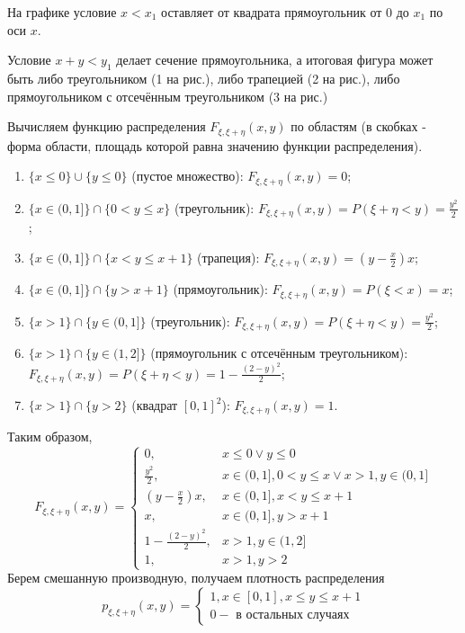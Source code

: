 \begin{enumerate}
	На графике условие $x < x_1$ оставляет от квадрата прямоугольник от 0 до $x_1$ по оси $x$.
	
	Условие $x + y < y_1$ делает сечение прямоугольника, а итоговая фигура может быть либо треугольником (1 на рис.), либо трапецией (2 на рис.), либо прямоугольником с отсечённым треугольником (3 на рис.)
	
	Вычисляем функцию распределения $F_{\xi, \xi + \eta} (x, y)$ по областям (в скобках - форма области, площадь которой равна значению функции распределения).
	\begin{enumerate}
		\item $\{ x \le 0 \} \cup \{ y \le 0 \}$ (пустое множество): $F_{\xi, \xi + \eta} (x, y) = 0$;
		\item $\{ x \in (0, 1] \} \cap \{ 0 < y \le x \}$ (треугольник): $F_{\xi, \xi + \eta} (x, y) = P(\xi + \eta < y) = \frac{y^2}{2}$;
		\item $\{ x \in (0, 1] \} \cap \{ x < y \le x + 1 \}$ (трапеция): $F_{\xi, \xi + \eta} (x, y) = \left(y-\frac{x}{2}\right)x$;
		\item $\{ x \in (0, 1] \} \cap \{ y > x + 1 \}$ (прямоугольник): $F_{\xi, \xi + \eta} (x, y) = P(\xi < x) = x$;
		\item $\{ x > 1 \} \cap \{ y \in (0, 1] \}$ (треугольник): $F_{\xi, \xi + \eta} (x, y) = P(\xi + \eta < y) = \frac{y^2}{2}$;
		\item $\{ x > 1 \} \cap \{ y \in (1, 2] \}$ (прямоугольник с отсечённым треугольником): $F_{\xi, \xi + \eta} (x, y) = P(\xi + \eta < y) = 1 - \frac{(2-y)^2}{2}$;
		\item $\{ x > 1 \} \cap \{ y > 2 \}$ (квадрат $[0, 1]^2$): $F_{\xi, \xi + \eta} (x, y) = 1$.
	\end{enumerate}
	Таким образом,
	\[
	F_{\xi, \xi + \eta} (x, y) =
	\begin{cases}
		0, &x \le 0 \lor y \le 0 \\
		\frac{y^2}{2}, &x \in (0, 1], 0 < y \le x \lor x > 1, y \in (0, 1] \\
		\left( y - \frac{x}{2} \right) x, &x \in (0, 1], x < y \le x + 1 \\
		x, &x \in (0, 1], y > x + 1 \\
		1 - \frac{(2-y)^2}{2}, &x > 1, y \in (1, 2] \\
		1, &x > 1, y > 2
	\end{cases}
	\]
	Берем смешанную производную, получаем плотность распределения
	\[
	p_{\xi, \xi + \eta} (x, y) =
	\begin{cases}
		1, x \in [0, 1], x \le y \le x + 1 \\
		0 - \text{ в остальных случаях}
	\end{cases}
	\]
	
\end{enumerate}


